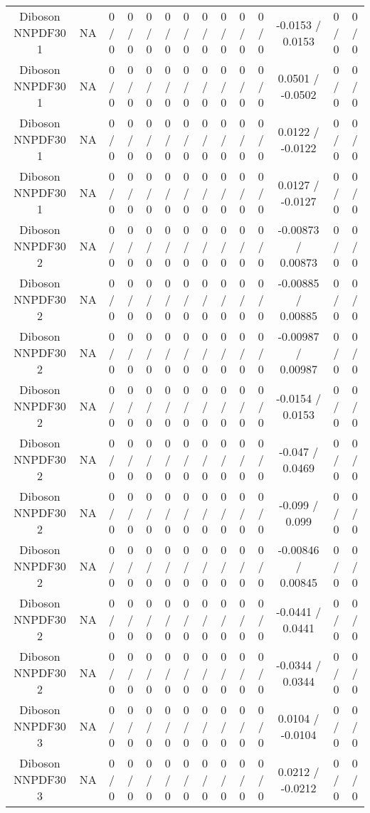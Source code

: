 \documentclass[10pt]{article}
\begin{document}
\begin{table}[htbp]
\begin{center}
\begin{tabular}{|c|c|c|c|c|c|c|c|c|c|c|c|c|c|}
  Diboson NNPDF30 1 &    NA    & 0 / 0 & 0 / 0 & 0 / 0 & 0 / 0 & 0 / 0 & 0 / 0 & 0 / 0 & 0 / 0 & 0 / 0 & -0.0153 / 0.0153 & 0 / 0 & 0 / 0 \\ 
  Diboson NNPDF30 1 &    NA    & 0 / 0 & 0 / 0 & 0 / 0 & 0 / 0 & 0 / 0 & 0 / 0 & 0 / 0 & 0 / 0 & 0 / 0 & 0.0501 / -0.0502 & 0 / 0 & 0 / 0 \\ 
  Diboson NNPDF30 1 &    NA    & 0 / 0 & 0 / 0 & 0 / 0 & 0 / 0 & 0 / 0 & 0 / 0 & 0 / 0 & 0 / 0 & 0 / 0 & 0.0122 / -0.0122 & 0 / 0 & 0 / 0 \\ 
  Diboson NNPDF30 1 &    NA    & 0 / 0 & 0 / 0 & 0 / 0 & 0 / 0 & 0 / 0 & 0 / 0 & 0 / 0 & 0 / 0 & 0 / 0 & 0.0127 / -0.0127 & 0 / 0 & 0 / 0 \\ 
  Diboson NNPDF30 2 &    NA    & 0 / 0 & 0 / 0 & 0 / 0 & 0 / 0 & 0 / 0 & 0 / 0 & 0 / 0 & 0 / 0 & 0 / 0 & -0.00873 / 0.00873 & 0 / 0 & 0 / 0 \\ 
  Diboson NNPDF30 2 &    NA    & 0 / 0 & 0 / 0 & 0 / 0 & 0 / 0 & 0 / 0 & 0 / 0 & 0 / 0 & 0 / 0 & 0 / 0 & -0.00885 / 0.00885 & 0 / 0 & 0 / 0 \\ 
  Diboson NNPDF30 2 &    NA    & 0 / 0 & 0 / 0 & 0 / 0 & 0 / 0 & 0 / 0 & 0 / 0 & 0 / 0 & 0 / 0 & 0 / 0 & -0.00987 / 0.00987 & 0 / 0 & 0 / 0 \\ 
  Diboson NNPDF30 2 &    NA    & 0 / 0 & 0 / 0 & 0 / 0 & 0 / 0 & 0 / 0 & 0 / 0 & 0 / 0 & 0 / 0 & 0 / 0 & -0.0154 / 0.0153 & 0 / 0 & 0 / 0 \\ 
  Diboson NNPDF30 2 &    NA    & 0 / 0 & 0 / 0 & 0 / 0 & 0 / 0 & 0 / 0 & 0 / 0 & 0 / 0 & 0 / 0 & 0 / 0 & -0.047 / 0.0469 & 0 / 0 & 0 / 0 \\ 
  Diboson NNPDF30 2 &    NA    & 0 / 0 & 0 / 0 & 0 / 0 & 0 / 0 & 0 / 0 & 0 / 0 & 0 / 0 & 0 / 0 & 0 / 0 & -0.099 / 0.099 & 0 / 0 & 0 / 0 \\ 
  Diboson NNPDF30 2 &    NA    & 0 / 0 & 0 / 0 & 0 / 0 & 0 / 0 & 0 / 0 & 0 / 0 & 0 / 0 & 0 / 0 & 0 / 0 & -0.00846 / 0.00845 & 0 / 0 & 0 / 0 \\ 
  Diboson NNPDF30 2 &    NA    & 0 / 0 & 0 / 0 & 0 / 0 & 0 / 0 & 0 / 0 & 0 / 0 & 0 / 0 & 0 / 0 & 0 / 0 & -0.0441 / 0.0441 & 0 / 0 & 0 / 0 \\ 
  Diboson NNPDF30 2 &    NA    & 0 / 0 & 0 / 0 & 0 / 0 & 0 / 0 & 0 / 0 & 0 / 0 & 0 / 0 & 0 / 0 & 0 / 0 & -0.0344 / 0.0344 & 0 / 0 & 0 / 0 \\ 
  Diboson NNPDF30 3 &    NA    & 0 / 0 & 0 / 0 & 0 / 0 & 0 / 0 & 0 / 0 & 0 / 0 & 0 / 0 & 0 / 0 & 0 / 0 & 0.0104 / -0.0104 & 0 / 0 & 0 / 0 \\ 
  Diboson NNPDF30 3 &    NA    & 0 / 0 & 0 / 0 & 0 / 0 & 0 / 0 & 0 / 0 & 0 / 0 & 0 / 0 & 0 / 0 & 0 / 0 & 0.0212 / -0.0212 & 0 / 0 & 0 / 0 \\ 

\end{tabular}
\end{center}
\end{table}
\end{document}
